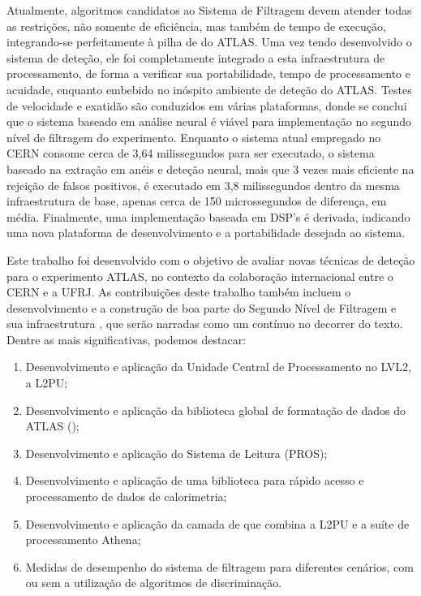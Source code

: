 Atualmente, algoritmos candidatos ao Sistema de Filtragem devem atender todas
as restrições, não somente de eficiência, mas também de tempo de execução,
integrando-se perfeitamente à pilha de  do ATLAS. Uma vez tendo
desenvolvido o sistema de deteção, ele foi completamente integrado a esta
infraestrutura de processamento, de forma a verificar sua portabilidade, tempo
de processamento e acuidade, enquanto embebido no inóspito ambiente de deteção
do ATLAS. Testes de velocidade e exatidão são conduzidos em várias
plataformas, donde se conclui que o sistema baseado em análise neural é viável
para implementação no segundo nível de filtragem do experimento. Enquanto o
sistema atual empregado no CERN consome cerca de 3,64 milissegundos para ser
executado, o sistema baseado na extração em anéis e deteção neural, mais que 3
vezes mais eficiente na rejeição de falsos positivos, é executado em 3,8
milissegundos dentro da mesma infraestrutura de base, apenas cerca de 150
microssegundos de diferença, em média. Finalmente, uma implementação baseada
em DSP's é derivada, indicando uma nova plataforma de desenvolvimento e a
portabilidade desejada ao sistema.

Este trabalho foi desenvolvido com o objetivo de avaliar novas técnicas de
deteção para o experimento ATLAS, no contexto da colaboração internacional
entre o CERN e a UFRJ. As contribuições deste trabalho também incluem o
desenvolvimento e a construção de boa parte do Segundo Nível de Filtragem e sua
infraestrutura , que serão narradas como um contínuo no decorrer do
texto. Dentre as mais significativas, podemos destacar:

\begin{enumerate}
\item Desenvolvimento e aplicação da Unidade Central de Processamento no
LVL2, a L2PU;
\item Desenvolvimento e aplicação da biblioteca global de formatação de dados
do ATLAS ();
\item Desenvolvimento e aplicação do  Sistema de Leitura (PROS);
\item Desenvolvimento e aplicação de uma biblioteca para rápido acesso e
processamento de dados de calorimetria;
\item Desenvolvimento e aplicação da camada de  que combina a
L2PU e a suíte de processamento  Athena;
\item Medidas de desempenho do sistema de filtragem para diferentes cenários,
com ou sem a utilização de algoritmos de discriminação.
\end{enumerate}

